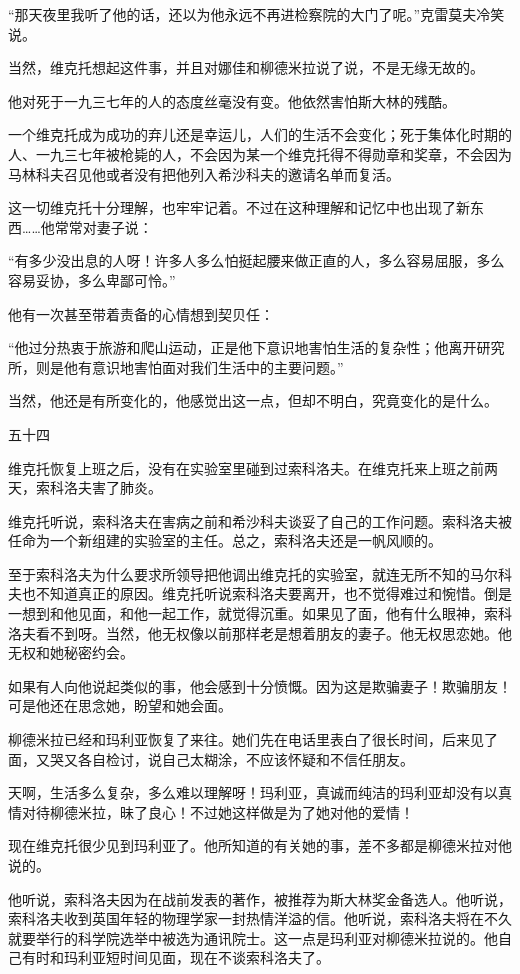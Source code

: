 “那天夜里我听了他的话，还以为他永远不再进检察院的大门了呢。”克雷莫夫冷笑说。

当然，维克托想起这件事，并且对娜佳和柳德米拉说了说，不是无缘无故的。

他对死于一九三七年的人的态度丝毫没有变。他依然害怕斯大林的残酷。

一个维克托成为成功的弃儿还是幸运儿，人们的生活不会变化；死于集体化时期的人、一九三七年被枪毙的人，不会因为某一个维克托得不得勋章和奖章，不会因为马林科夫召见他或者没有把他列入希沙科夫的邀请名单而复活。

这一切维克托十分理解，也牢牢记着。不过在这种理解和记忆中也出现了新东西……他常常对妻子说：

“有多少没出息的人呀！许多人多么怕挺起腰来做正直的人，多么容易屈服，多么容易妥协，多么卑鄙可怜。”

他有一次甚至带着责备的心情想到契贝任：

“他过分热衷于旅游和爬山运动，正是他下意识地害怕生活的复杂性；他离开研究所，则是他有意识地害怕面对我们生活中的主要问题。”

当然，他还是有所变化的，他感觉出这一点，但却不明白，究竟变化的是什么。

五十四

维克托恢复上班之后，没有在实验室里碰到过索科洛夫。在维克托来上班之前两天，索科洛夫害了肺炎。

维克托听说，索科洛夫在害病之前和希沙科夫谈妥了自己的工作问题。索科洛夫被任命为一个新组建的实验室的主任。总之，索科洛夫还是一帆风顺的。

至于索科洛夫为什么要求所领导把他调出维克托的实验室，就连无所不知的马尔科夫也不知道真正的原因。维克托听说索科洛夫要离开，也不觉得难过和惋惜。倒是一想到和他见面，和他一起工作，就觉得沉重。如果见了面，他有什么眼神，索科洛夫看不到呀。当然，他无权像以前那样老是想着朋友的妻子。他无权思恋她。他无权和她秘密约会。

如果有人向他说起类似的事，他会感到十分愤慨。因为这是欺骗妻子！欺骗朋友！可是他还在思念她，盼望和她会面。

柳德米拉已经和玛利亚恢复了来往。她们先在电话里表白了很长时间，后来见了面，又哭又各自检讨，说自己太糊涂，不应该怀疑和不信任朋友。

天啊，生活多么复杂，多么难以理解呀！玛利亚，真诚而纯洁的玛利亚却没有以真情对待柳德米拉，昧了良心！不过她这样做是为了她对他的爱情！

现在维克托很少见到玛利亚了。他所知道的有关她的事，差不多都是柳德米拉对他说的。

他听说，索科洛夫因为在战前发表的著作，被推荐为斯大林奖金备选人。他听说，索科洛夫收到英国年轻的物理学家一封热情洋溢的信。他听说，索科洛夫将在不久就要举行的科学院选举中被选为通讯院士。这一点是玛利亚对柳德米拉说的。他自己有时和玛利亚短时间见面，现在不谈索科洛夫了。

